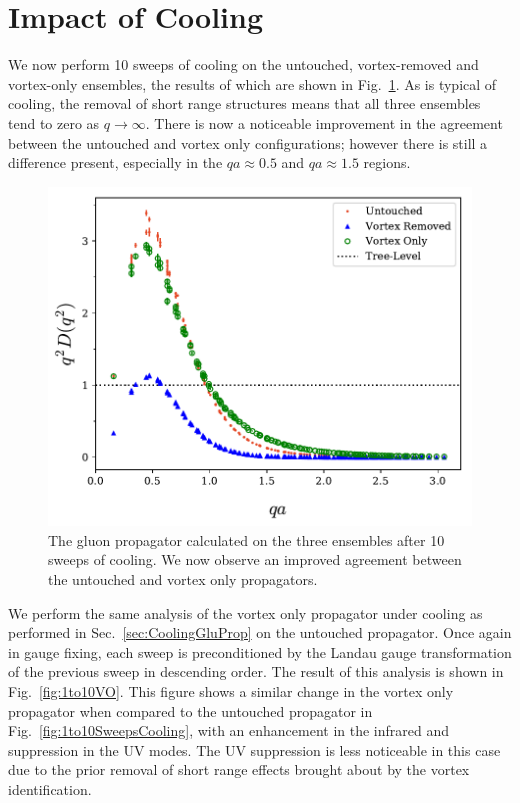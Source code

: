 
\section{Impact of Cooling}
We now perform 10 sweeps of cooling on the untouched, vortex-removed and vortex-only ensembles, the results of which are shown in Fig.~\ref{fig:10SweepsCooling}. As is typical of cooling, the removal of short range structures means that all three ensembles tend to zero as $q\rightarrow\infty$. There is now a noticeable improvement in the agreement between the untouched and vortex only configurations; however there is still a difference present, especially in the $qa\approx0.5$ and $qa\approx1.5$ regions.\\
%
\begin{figure}[H]
\centering
\includegraphics[width=\linewidth]{./ScalarGluComp_q2_10sweepsAll.pdf}
\caption[The gluon propagator calculated on the three ensembles after 10 sweeps of cooling.]{\label{fig:10SweepsCooling}The gluon propagator calculated on the three ensembles after 10 sweeps of cooling. We now observe an improved agreement between the untouched and vortex only propagators.}
\end{figure}  
%

We perform the same analysis of the vortex only propagator under cooling as performed in Sec.~\ref{sec:CoolingGluProp} on the untouched propagator. Once again in gauge fixing, each sweep is preconditioned by the Landau gauge transformation of the previous sweep in descending order. The result of this analysis is shown in Fig.~\ref{fig:1to10VO}. This figure shows a similar change in the vortex only propagator when compared to the untouched propagator in Fig.~\ref{fig:1to10SweepsCooling}, with an enhancement in the infrared and suppression in the UV modes. The UV suppression is less noticeable in this case due to the prior removal of short range effects brought about by the vortex identification.\\

